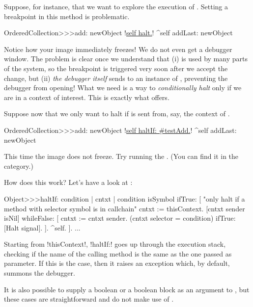 \documentclass[a4paper,10pt,twoside]{book}
\begin{document}
Suppose, for instance, that we want to explore the execution of .
Setting a breakpoint in this method is problematic.

\begin{code}{}
OrderedCollection>>>add: newObject
	!\underline{self halt.}!
	^self addLast: newObject
\end{code}

Notice how your image immediately freezes!  We do not even get a debugger window.
The problem is clear once we understand that (i)  is used by many parts of the system, so the breakpoint is triggered very soon after we accept the change, but (ii) \emph{the debugger itself} sends  to an instance of , preventing the debugger from opening!
What we need is a way to \emph{conditionally halt} only if we are in a context of interest.
This is exactly what  offers.

Suppose now that we only want to halt if  is sent from, say, the context of .

\begin{code}{}
OrderedCollection>>>add: newObject
	!\underline{self haltIf: \#testAdd.}!
	^self addLast: newObject
\end{code}

This time the image does not freeze. Try running the .
(You can find it in the  category.)

How does this work?  Let's have a look at :
\begin{code}{}
Object>>>haltIf: condition
	| cntxt |
	condition isSymbol ifTrue: [
		"only halt if a method with selector symbol is in callchain"
		cntxt := thisContext.
		[cntxt sender isNil] whileFalse: [
			cntxt := cntxt sender. 
			(cntxt selector = condition) ifTrue: [Halt signal]. ].
		^self.
	].
	...
\end{code}

Starting from \ct!thisContext!, \ct!haltIf:! goes up through the execution stack, checking if the name of the calling method is the same as the one passed as parameter.
If this is the case, then it raises an exception which, by default, summons the debugger.

It is also possible to supply a boolean or a boolean block as an argument to , but these cases are straightforward and do not make use of .
\end{document}
